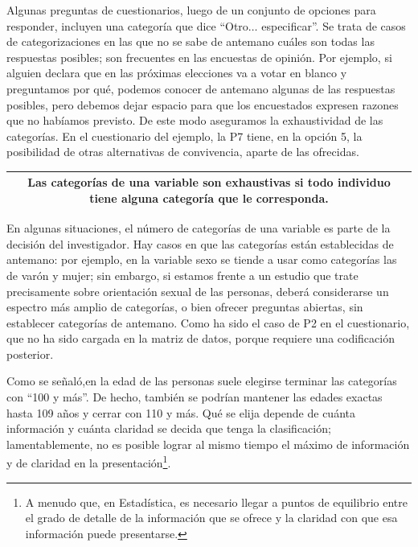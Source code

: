 \documentclass[]{book}
\let\rmarkdownfootnote\footnote%
\def\footnote{\protect\rmarkdownfootnote}
\begin{document}
Algunas preguntas de cuestionarios, luego de un conjunto de opciones para responder, incluyen una categoría que dice ``Otro\(\ldots\) especificar''. Se trata de casos de categorizaciones en las que no se sabe de antemano cuáles son todas las respuestas posibles; son frecuentes en las encuestas de opinión. Por ejemplo, si alguien declara que en las próximas elecciones va a votar en blanco y preguntamos por qué, podemos conocer de antemano algunas de las respuestas posibles, pero debemos dejar espacio para que los encuestados expresen razones que no habíamos previsto. De este modo aseguramos la exhaustividad de las categorías. En el cuestionario del ejemplo, la P7 tiene, en la opción 5, la posibilidad de otras alternativas de convivencia, aparte de las ofrecidas.

\begin{longtable}[]{@{}c@{}}
\toprule
\endhead
\begin{minipage}[t]{0.97\columnwidth}\centering
Las categorías de una variable son \textbf{exhaustivas} si todo individuo tiene alguna categoría que le corresponda.\strut
\end{minipage}\tabularnewline
\bottomrule
\end{longtable}

En algunas situaciones, el número de categorías de una variable es parte de la decisión del investigador. Hay casos en que las categorías están establecidas de antemano: por ejemplo, en la variable sexo se tiende a usar como categorías las de varón y mujer; sin embargo, si estamos frente a un estudio que trate precisamente sobre orientación sexual de las personas, deberá considerarse un espectro más amplio de categorías, o bien ofrecer preguntas abiertas, sin establecer categorías de antemano. Como ha sido el caso de P2 en el cuestionario, que no ha sido cargada en la matriz de datos, porque requiere una codificación posterior.

Como se señaló,en la edad de las personas suele elegirse terminar las categorías con ``100 y más''. De hecho, también se podrían mantener las edades exactas hasta 109 años y cerrar con 110 y más. Qué se elija depende de cuánta información y cuánta claridad se decida que tenga la clasificación; lamentablemente, no es posible lograr al mismo tiempo el máximo de información y de claridad en la presentación\footnote{A menudo que, en Estadística, es necesario llegar a puntos de equilibrio entre el grado de detalle de la información que se ofrece y la claridad con que esa información puede presentarse.}.
\end{document}

